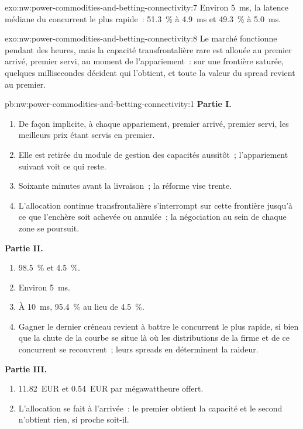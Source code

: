 \begin{solution}{exo:nw:power-commodities-and-betting-connectivity:7}
Environ \qty{5}{\milli\second}, la latence médiane du concurrent le plus rapide~: 51.3~\% à \qty{4.9}{\milli\second} et 49.3~\% à \qty{5.0}{\milli\second}.
\end{solution}

\begin{solution}{exo:nw:power-commodities-and-betting-connectivity:8}
Le marché fonctionne pendant des heures, mais la capacité transfrontalière rare est allouée au premier arrivé, premier servi, au moment de l'appariement~: sur une
frontière saturée, quelques millisecondes décident qui l'obtient, et toute la valeur du spread revient au premier.
\end{solution}

\begin{solution}{pb:nw:power-commodities-and-betting-connectivity:1}
\textbf{Partie I.}
\begin{enumerate}
\item De façon implicite, à chaque appariement, premier arrivé, premier servi, les meilleurs prix étant servis en premier.
\item Elle est retirée du module de gestion des capacités aussitôt~; l'appariement suivant voit ce qui reste.
\item Soixante minutes avant la livraison~; la réforme vise trente.
\item L'allocation continue transfrontalière s'interrompt sur cette frontière jusqu'à ce que l'enchère soit achevée ou annulée~; la négociation au sein de chaque zone
  se poursuit.
\end{enumerate}
\textbf{Partie II.}
\begin{enumerate}[resume]
\item 98.5~\% et 4.5~\%.
\item Environ \qty{5}{\milli\second}.
\item À \qty{10}{\milli\second}, 95.4~\% au lieu de 4.5~\%.
\item Gagner le dernier créneau revient à battre le concurrent le plus rapide, si bien que la chute de la courbe se situe là où les distributions de la firme et de ce concurrent
  se recouvrent~; leurs spreads en déterminent la raideur.
\end{enumerate}
\textbf{Partie III.}
\begin{enumerate}[resume]
\item 11.82~EUR et 0.54~EUR par mégawattheure offert.
\item L'allocation se fait à l'arrivée~: le premier obtient la capacité et le second n'obtient rien, si proche soit-il.

\end{enumerate}
\end{solution}

